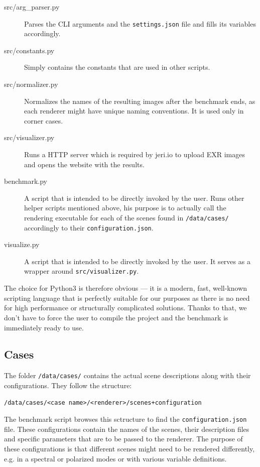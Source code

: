 \begin{description}
	\item[src/arg\_parser.py] Parses the CLI arguments and the \texttt{settings.json} file and fills its variables accordingly.
	\item[src/constants.py] Simply contains the constants that are used in other scripts.
	\item[src/normalizer.py] Normalizes the names of the resulting images after the benchmark ends, as each renderer might have unique naming conventions. It is used only in corner cases.
	\item[src/visualizer.py] Runs a HTTP server which is required by jeri.io to upload EXR images and opens the website with the results.
	\item[benchmark.py] A script that is intended to be directly invoked by the user. Runs other helper scripts mentioned above, his purpose is to actually call the rendering executable for each of the scenes found in \texttt{/data/cases/} accordingly to their \texttt{configuration.json}.
	\item[visualize.py] A script that is intended to be directly invoked by the user. It serves as a wrapper around \texttt{src/visualizer.py}.
\end{description}

The choice for Python3 is therefore obvious --- it is a modern, fast, well-known scripting language that is perfectly suitable for our purposes as there is no need for high performance or structurally complicated solutions. Thanks to that, we don't have to force the user to compile the project and the benchmark is immediately ready to use.

\subsection{Cases}

The folder \texttt{/data/cases/} contains the actual scene descriptions along with their configurations. They follow the structure:

\begin{lstlisting}
/data/cases/<case name>/<renderer>/scenes+configuration
\end{lstlisting}

The benchmark script browses this sctructure to find the \texttt{configuration.json} file. These configurations contain the names of the scenes, their description files and specific parameters that are to be passed to the renderer. The purpose of these configurations is that different scenes might need to be rendered differently, e.g. in a spectral or polarized modes or with various variable definitions.

